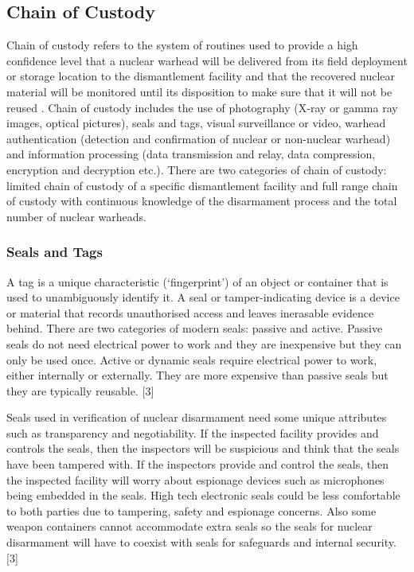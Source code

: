 \documentclass[twocolumn,a4paper]{article}
\begin{document}
\subsection{Chain of Custody}
Chain of custody refers to the system of routines used to provide a high confidence level that a
nuclear warhead will be delivered from its field deployment or storage location to the
dismantlement facility and that the recovered nuclear material will be monitored until its disposition
to make sure that it will not be reused \citep{zarimpas2003}. Chain of custody includes the use of photography (X-ray
or gamma ray images, optical pictures), seals and tags, visual surveillance or video, warhead
authentication (detection and confirmation of nuclear or non-nuclear warhead) and information
processing (data transmission and relay, data compression, encryption and decryption etc.). There
are two categories of chain of custody: limited chain of custody of a specific dismantlement facility
and full range chain of custody with continuous knowledge of the disarmament process and the total
number of nuclear warheads. \citep{wuwen2004}

\subsubsection{Seals and Tags}
A tag is a unique characteristic (`fingerprint') of an object or container that is used to unambiguously
identify it. A seal or tamper-indicating device is a device or material that records unauthorised access
and leaves inerasable evidence behind. There are two categories of modern seals: passive and
active. Passive seals do not need electrical power to work and they are inexpensive but they can only
be used once. Active or dynamic seals require electrical power to work, either internally or
externally. They are more expensive than passive seals but they are typically reusable. [3]

Seals used in verification of nuclear disarmament need some unique attributes such as transparency
and negotiability. If the inspected facility provides and controls the seals, then the inspectors will be
suspicious and think that the seals have been tampered with. If the inspectors provide and control
the seals, then the inspected facility will worry about espionage devices such as microphones being
embedded in the seals. High tech electronic seals could be less comfortable to both parties due to
tampering, safety and espionage concerns. Also some weapon containers cannot accommodate
extra seals so the seals for nuclear disarmament will have to coexist with seals for safeguards and
internal security. [3]
\end{document}
